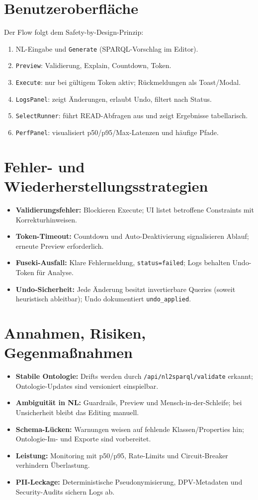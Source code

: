 \section{Benutzeroberfläche}
Der Flow folgt dem Safety-by-Design-Prinzip:
\begin{enumerate}
  \item NL-Eingabe und \texttt{Generate} (SPARQL-Vorschlag im Editor).
  \item \texttt{Preview}: Validierung, Explain, Countdown, Token.
  \item \texttt{Execute}: nur bei gültigem Token aktiv; Rückmeldungen als Toast/Modal.
  \item \texttt{LogsPanel}: zeigt Änderungen, erlaubt Undo, filtert nach Status.
  \item \texttt{SelectRunner}: führt READ-Abfragen aus und zeigt Ergebnisse tabellarisch.
  \item \texttt{PerfPanel}: visualisiert p50/p95/Max-Latenzen und häufige Pfade.
\end{enumerate}

\section{Fehler- und Wiederherstellungsstrategien}
\begin{itemize}
  \item \textbf{Validierungsfehler:} Blockieren Execute; UI listet betroffene Constraints mit Korrekturhinweisen.
  \item \textbf{Token-Timeout:} Countdown und Auto-Deaktivierung signalisieren Ablauf; erneute Preview erforderlich.
  \item \textbf{Fuseki-Ausfall:} Klare Fehlermeldung, \texttt{status=failed}; Logs behalten Undo-Token für Analyse.
  \item \textbf{Undo-Sicherheit:} Jede Änderung besitzt invertierbare Queries (soweit heuristisch ableitbar); Undo dokumentiert \texttt{undo\_applied}.
\end{itemize}

\section{Annahmen, Risiken, Gegenmaßnahmen}
\begin{itemize}
  \item \textbf{Stabile Ontologie:} Drifts werden durch \texttt{/api/nl2sparql/validate} erkannt; Ontologie-Updates sind versioniert einspielbar.
  \item \textbf{Ambiguität in NL:} Guardrails, Preview und Mensch-in-der-Schleife; bei Unsicherheit bleibt das Editing manuell.
  \item \textbf{Schema-Lücken:} Warnungen weisen auf fehlende Klassen/Properties hin; Ontologie-Im- und Exporte sind vorbereitet.
  \item \textbf{Leistung:} Monitoring mit p50/p95, Rate-Limits und Circuit-Breaker verhindern Überlastung.
  \item \textbf{PII-Leckage:} Deterministische Pseudonymisierung, DPV-Metadaten und Security-Audits sichern Logs ab.
\end{itemize}

